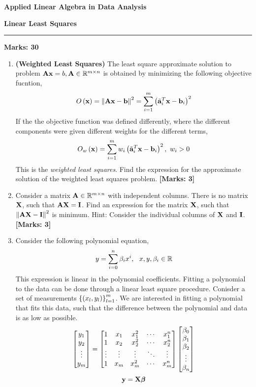 \documentclass[12pt]{article}
\def\mf{\ensuremath\mathbf}
\def\mb{\ensuremath\mathbb}
\def\lp{\ensuremath\left(}
\def\rp{\ensuremath\right)}
\def\lV{\ensuremath\left\lVert}
\def\rV{\ensuremath\right\rVert}
\def\lc{\ensuremath\left\{}
\def\rc{\ensuremath\right\}}
\def\bmxc{\ensuremath\begin{bmatrix*}[c]}
\def\emxc{\ensuremath\end{bmatrix*}}
\begin{document}
\begin{center}
\begin{large}
\textbf{Applied Linear Algebra in Data Analysis}\\
\vspace{0.1cm}
\end{large}
\textbf{Linear Least Squares}
\end{center}
\hrule
\vspace{1em}

\begin{large}
    \textbf{Marks: 30}
\end{large}

\begin{enumerate}
    \item \textbf{(Weighted Least Squares)} The least square approximate solution to  problem $\mf{Ax} = b, \mf{A} \in \mb{R}^{m \times n}$ is obtained by minimizing the following objective fucntion,
    \[ O\lp\mf{x}\rp = \lV\mf{Ax} - \mf{b}\rV^2 = \sum_{i=1}^{m} \lp\tilde{\mf{a}}_i^T\mf{x} - \mf{b}_i\rp^2 \]
    If the the objective function was defined differently, where the different components were given different weights for the different terms, 
    \[ O_w\lp\mf{x}\rp = \sum_{i=1}^{m} w_i\lp\tilde{\mf{a}}_i^T\mf{x} - \mf{b}_i\rp^2, \,\, w_i > 0 \]
    This is the \textit{weighted least squares}. Find the expression for the approximate solution of the weighted least squares problem. \textbf{[Marks: 3]}

    \item Consider a matrix $\mf{A} \in \mb{R}^{m \times n}$ with independent columns. There is no matrix $\mf{X}$, such that $\mf{A}\mf{X} = \mf{I}$. Find an expression for the matrix $\mf{X}$, such that $\lV\mf{A}\mf{X} - \mf{I}\rV^2$ is minimum. Hint: Consider the individual columns of $\mf{X}$ and $\mf{I}$.\textbf{[Marks: 3]}

    \item Consider the following polynomial equation,
    \[ y = \sum_{i=0}^{n} \beta_i x^i, \,\,\,\, x, y, \beta_i \in \mb{R} \]
    This expression is linear in the polynomial coefficients. Fitting a polynomial to the data can be done through a linear least square procedure. Conisder a set of measurements $\lc\lp x_l, y_l \rp\rc_{l=1}^{m}$. We are interested in fitting a polynomial that fits this data, such that the difference between the polynomial and data is as low as possible.
    \[ \bmxc y_1\\ y_2\\ \vdots \\ y_m\emxc = \bmxc 1 & x_1 & x_1^2 & \cdots & x_1^n\\ 1 & x_2 & x_2^2 & \cdots & x_2^n\\ \vdots & \vdots & \vdots & \ddots & \vdots\\ 1 & x_m & x_m^2 & \cdots & x_m^n \emxc \bmxc\beta_0 \\ \beta_1 \\ \beta_2 \\ \vdots \\ \beta_n\emxc \]
    \[ \mf{y} = \mf{X}\bm{\beta} \]


\end{enumerate}
\end{document}
